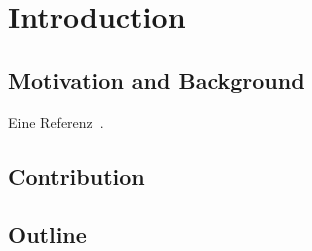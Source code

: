 \chapter{Introduction}
\section{Motivation and Background}
Eine Referenz~\cite{AggarwalV88}.
\section{Contribution}
\section{Outline}